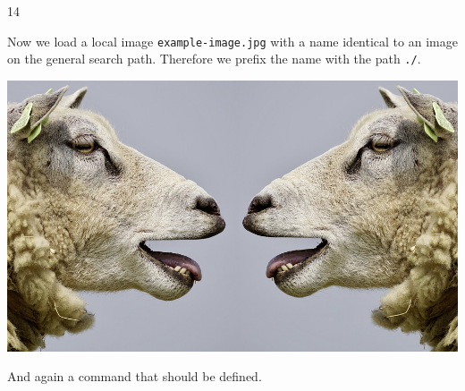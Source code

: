 \documentclass[../../../main.tex]{subfiles}
\begin{document}
14

Now we load a local image \verb|example-image.jpg| with a name
identical to an image on the general search path. Therefore we prefix the name with the path \verb|./|.
\begin{center}
\includegraphics{./example-image}
\end{center}

And again a command that should be defined.

\mycmd
\end{document}
